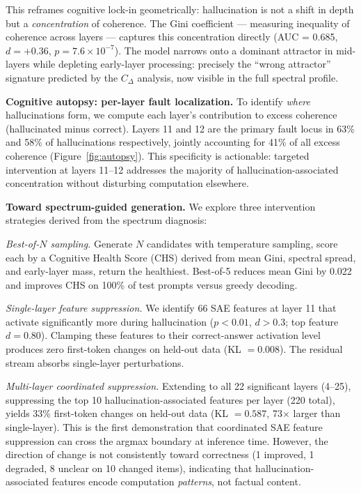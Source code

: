 \documentclass{article}
\begin{document}
This reframes cognitive lock-in geometrically: hallucination is
not a shift in depth but a \textit{concentration} of coherence.
The Gini coefficient --- measuring inequality of coherence across
layers --- captures this concentration directly (AUC = 0.685,
$d = +0.36$, $p = 7.6 \times 10^{-7}$). The model narrows onto
a dominant attractor in mid-layers while depleting early-layer
processing: precisely the ``wrong attractor'' signature predicted
by the $C_\Delta$ analysis, now visible in the full spectral
profile.

\textbf{Cognitive autopsy: per-layer fault localization.}
To identify \textit{where} hallucinations form, we compute
each layer's contribution to excess coherence (hallucinated
minus correct). Layers 11 and 12 are the primary fault
locus in 63\% and 58\% of hallucinations respectively,
jointly accounting for 41\% of all excess coherence
(Figure~\ref{fig:autopsy}). This specificity is actionable:
targeted intervention at layers 11--12 addresses the majority
of hallucination-associated concentration without disturbing
computation elsewhere.

\textbf{Toward spectrum-guided generation.}
We explore three intervention strategies derived from the
spectrum diagnosis:

\textit{Best-of-$N$ sampling.} Generate $N$ candidates with
temperature sampling, score each by a Cognitive Health Score
(CHS) derived from mean Gini, spectral spread, and early-layer
mass, return the healthiest. Best-of-5 reduces mean Gini by
0.022 and improves CHS on 100\% of test prompts versus greedy
decoding.

\textit{Single-layer feature suppression.} We identify 66 SAE
features at layer 11 that activate significantly more during
hallucination ($p < 0.01$, $d > 0.3$; top feature $d = 0.80$).
Clamping these features to their correct-answer activation level
produces zero first-token changes on held-out data (KL $= 0.008$).
The residual stream absorbs single-layer perturbations.

\textit{Multi-layer coordinated suppression.} Extending to all 22
significant layers (4--25), suppressing the top 10
hallucination-associated features per layer (220 total), yields
33\% first-token changes on held-out data (KL $= 0.587$,
73$\times$ larger than single-layer). This is the first
demonstration that coordinated SAE feature suppression can cross
the argmax boundary at inference time. However, the direction of
change is not consistently toward correctness (1 improved, 1
degraded, 8 unclear on 10 changed items), indicating that
hallucination-associated features encode computation
\textit{patterns}, not factual content.
\end{document}
